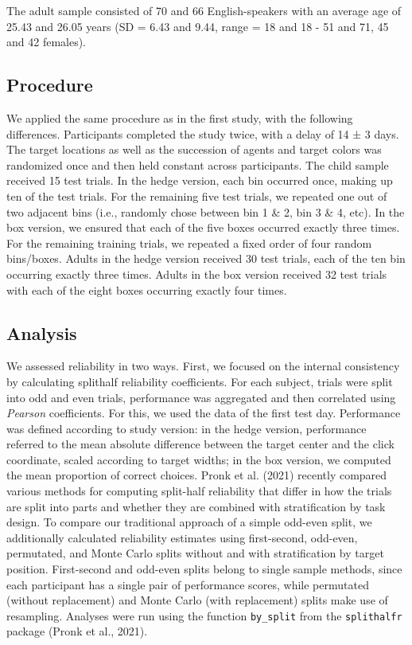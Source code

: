 \documentclass[
  man,floatsintext]{apa6}
\begin{document}
The adult sample consisted of 70 and 66 English-speakers with an average age of 25.43 and 26.05 years (SD = 6.43 and 9.44, range = 18 and 18 - 51 and 71, 45 and 42 females).

\hypertarget{procedure-1}{%
\subsection{Procedure}\label{procedure-1}}

We applied the same procedure as in the first study, with the following differences. Participants completed the study twice, with a delay of 14 ± 3 days. The target locations as well as the succession of agents and target colors was randomized once and then held constant across participants.
The child sample received 15 test trials. In the hedge version, each bin occurred once, making up ten of the test trials. For the remaining five test trials, we repeated one out of two adjacent bins (i.e., randomly chose between bin 1 \& 2, bin 3 \& 4, etc). In the box version, we ensured that each of the five boxes occurred exactly three times. For the remaining training trials, we repeated a fixed order of four random bins/boxes.
Adults in the hedge version received 30 test trials, each of the ten bin occurring exactly three times. Adults in the box version received 32 test trials with each of the eight boxes occurring exactly four times.

\hypertarget{analysis-1}{%
\subsection{Analysis}\label{analysis-1}}

We assessed reliability in two ways. First, we focused on the internal consistency by calculating splithalf reliability coefficients. For each subject, trials were split into odd and even trials, performance was aggregated and then correlated using \emph{Pearson} coefficients. For this, we used the data of the first test day. Performance was defined according to study version: in the hedge version, performance referred to the mean absolute difference between the target center and the click coordinate, scaled according to target widths; in the box version, we computed the mean proportion of correct choices.
Pronk et al. (2021) recently compared various methods for computing split-half reliability that differ in how the trials are split into parts and whether they are combined with stratification by task design. To compare our traditional approach of a simple odd-even split, we additionally calculated reliability estimates using first-second, odd-even, permutated, and Monte Carlo splits without and with stratification by target position. First-second and odd-even splits belong to single sample methods, since each participant has a single pair of performance scores, while permutated (without replacement) and Monte Carlo (with replacement) splits make use of resampling. Analyses were run using the function \texttt{by\_split} from the \texttt{splithalfr} package (Pronk et al., 2021).
\end{document}

